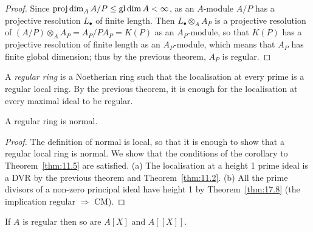 \begin{proof}
Since $\operatorname{proj\,dim}_A A/P \le \operatorname{gl\,dim} A < \infty$, as an $A$-module $A/P$ has a
projective resolution $L_\bullet$ of finite length. Then $L_\bullet \otimes_A A_P$ is a projective
resolution of $(A/P) \otimes_A A_P = A_P/PA_P = K(P)$ as an $A_P$-module, so that $K(P)$
has a projective resolution of finite length as an $A_P$-module, which means that $A_P$
has finite global dimension; thus by the previous theorem, $A_P$ is
regular.
\end{proof}

\begin{definition*}
A \emph{regular ring} is a Noetherian ring such that the localisation
at every prime is a regular local ring. By the previous theorem, it is
enough for the localisation at every maximal ideal to be regular.
\end{definition*}

\begin{theorem}\label{thm:19.4}
A regular ring is normal.
\end{theorem}

\begin{proof}
The definition of normal is local, so that it is enough to show that a
regular local ring is normal. We show that the conditions of the corollary
to Theorem~\ref{thm:11.5} are satisfied. (a) The localisation at a height 1 prime ideal is a
DVR by the previous theorem and Theorem~\ref{thm:11.2}. (b) All the prime
divisors of a non-zero principal ideal have height 1 by Theorem~\ref{thm:17.8} (the
implication regular $\Rightarrow$ CM).
\end{proof}

\begin{theorem}\label{thm:19.5}
If $A$ is regular then so are $A[X]$ and $A[[X]]$.
\end{theorem}

